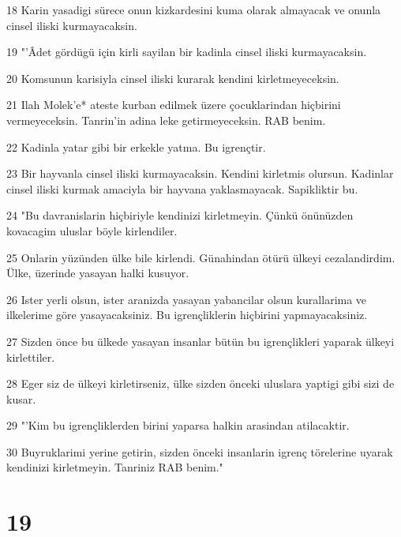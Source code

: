 \par 18 Karin yasadigi sürece onun kizkardesini kuma olarak almayacak ve onunla cinsel iliski kurmayacaksin.
\par 19 "'Âdet gördügü için kirli sayilan bir kadinla cinsel iliski kurmayacaksin.
\par 20 Komsunun karisiyla cinsel iliski kurarak kendini kirletmeyeceksin.
\par 21 Ilah Molek'e* ateste kurban edilmek üzere çocuklarindan hiçbirini vermeyeceksin. Tanrin'in adina leke getirmeyeceksin. RAB benim.
\par 22 Kadinla yatar gibi bir erkekle yatma. Bu igrençtir.
\par 23 Bir hayvanla cinsel iliski kurmayacaksin. Kendini kirletmis olursun. Kadinlar cinsel iliski kurmak amaciyla bir hayvana yaklasmayacak. Sapikliktir bu.
\par 24 "Bu davranislarin hiçbiriyle kendinizi kirletmeyin. Çünkü önünüzden kovacagim uluslar böyle kirlendiler.
\par 25 Onlarin yüzünden ülke bile kirlendi. Günahindan ötürü ülkeyi cezalandirdim. Ülke, üzerinde yasayan halki kusuyor.
\par 26 Ister yerli olsun, ister aranizda yasayan yabancilar olsun kurallarima ve ilkelerime göre yasayacaksiniz. Bu igrençliklerin hiçbirini yapmayacaksiniz.
\par 27 Sizden önce bu ülkede yasayan insanlar bütün bu igrençlikleri yaparak ülkeyi kirlettiler.
\par 28 Eger siz de ülkeyi kirletirseniz, ülke sizden önceki uluslara yaptigi gibi sizi de kusar.
\par 29 "'Kim bu igrençliklerden birini yaparsa halkin arasindan atilacaktir.
\par 30 Buyruklarimi yerine getirin, sizden önceki insanlarin igrenç törelerine uyarak kendinizi kirletmeyin. Tanriniz RAB benim."

\chapter{19}

